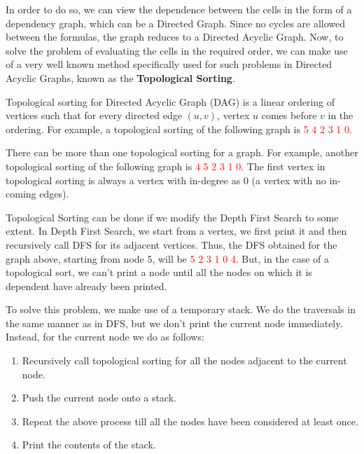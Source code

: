 In order to do so, we can view the dependence between the cells in the form of a dependency graph, which can be a Directed Graph. Since no cycles are allowed between the formulas, the graph reduces to a Directed Acyclic Graph. Now, to solve the problem of evaluating the cells in the required order, we can make use of a very well known method specifically used for such problems in Directed Acyclic Graphs, known as the \textbf{Topological Sorting}.

Topological sorting for Directed Acyclic Graph (DAG) is a linear ordering of vertices such that for every directed edge $(u,v)$, vertex $u$ comes before $v$ in the ordering. For example, a topological sorting of the following graph is \textcolor{red}{5 4 2 3 1 0}.

\begin{figure}[H]
\end{figure}

There can be more than one topological sorting for a graph. For example, another topological sorting of the following graph is \textcolor{red}{4 5 2 3 1 0}. The first vertex in topological sorting is always a vertex with in-degree as 0 (a vertex with no in-coming edges).

Topological Sorting can be done if we modify the Depth First Search to some extent. In Depth First Search, we start from a vertex, we first print it and then recursively call DFS for its adjacent vertices. Thus, the DFS obtained for the graph above, starting from node 5, will be \textcolor{red}{5 2 3 1 0 4}. But, in the case of a topological sort, we can't print a node until all the nodes on which it is dependent have already been printed.

To solve this problem, we make use of a temporary stack. We do the traversals in the same manner as in DFS, but we don’t print the current node immediately. Instead, for the current node we do as follows:

\begin{enumerate}
\item Recursively call topological sorting for all the nodes adjacent to the current node.

\item Push the current node onto a stack.

\item Repeat the above process till all the nodes have been considered at least once.

\item Print the contents of the stack.

\end{enumerate}

